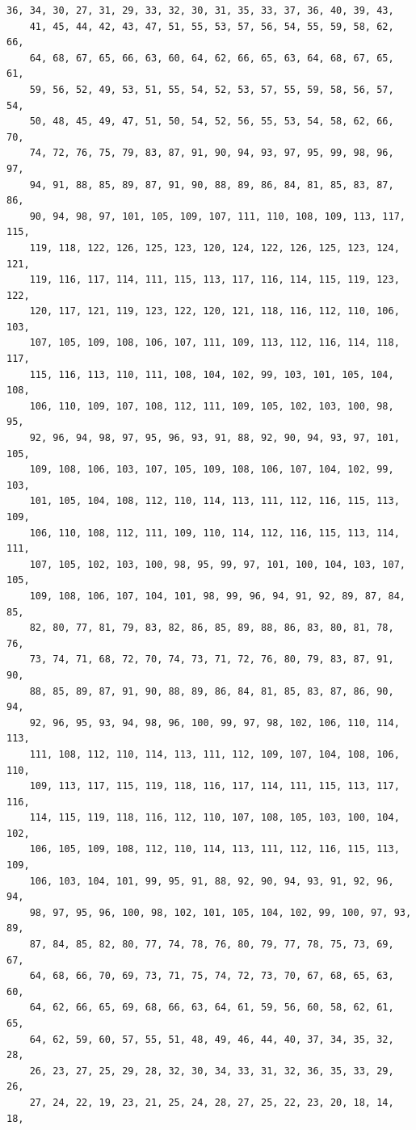 \documentclass[a4paper,11pt]{report}
\begin{document}
{{\begin{Verbatim}[commandchars=!@|,fontsize=\small,frame=single,label=Example]
    36, 34, 30, 27, 31, 29, 33, 32, 30, 31, 35, 33, 37, 36, 40, 39, 43, 
    41, 45, 44, 42, 43, 47, 51, 55, 53, 57, 56, 54, 55, 59, 58, 62, 66, 
    64, 68, 67, 65, 66, 63, 60, 64, 62, 66, 65, 63, 64, 68, 67, 65, 61, 
    59, 56, 52, 49, 53, 51, 55, 54, 52, 53, 57, 55, 59, 58, 56, 57, 54, 
    50, 48, 45, 49, 47, 51, 50, 54, 52, 56, 55, 53, 54, 58, 62, 66, 70, 
    74, 72, 76, 75, 79, 83, 87, 91, 90, 94, 93, 97, 95, 99, 98, 96, 97, 
    94, 91, 88, 85, 89, 87, 91, 90, 88, 89, 86, 84, 81, 85, 83, 87, 86, 
    90, 94, 98, 97, 101, 105, 109, 107, 111, 110, 108, 109, 113, 117, 115, 
    119, 118, 122, 126, 125, 123, 120, 124, 122, 126, 125, 123, 124, 121, 
    119, 116, 117, 114, 111, 115, 113, 117, 116, 114, 115, 119, 123, 122, 
    120, 117, 121, 119, 123, 122, 120, 121, 118, 116, 112, 110, 106, 103, 
    107, 105, 109, 108, 106, 107, 111, 109, 113, 112, 116, 114, 118, 117, 
    115, 116, 113, 110, 111, 108, 104, 102, 99, 103, 101, 105, 104, 108, 
    106, 110, 109, 107, 108, 112, 111, 109, 105, 102, 103, 100, 98, 95, 
    92, 96, 94, 98, 97, 95, 96, 93, 91, 88, 92, 90, 94, 93, 97, 101, 105, 
    109, 108, 106, 103, 107, 105, 109, 108, 106, 107, 104, 102, 99, 103, 
    101, 105, 104, 108, 112, 110, 114, 113, 111, 112, 116, 115, 113, 109, 
    106, 110, 108, 112, 111, 109, 110, 114, 112, 116, 115, 113, 114, 111, 
    107, 105, 102, 103, 100, 98, 95, 99, 97, 101, 100, 104, 103, 107, 105, 
    109, 108, 106, 107, 104, 101, 98, 99, 96, 94, 91, 92, 89, 87, 84, 85, 
    82, 80, 77, 81, 79, 83, 82, 86, 85, 89, 88, 86, 83, 80, 81, 78, 76, 
    73, 74, 71, 68, 72, 70, 74, 73, 71, 72, 76, 80, 79, 83, 87, 91, 90, 
    88, 85, 89, 87, 91, 90, 88, 89, 86, 84, 81, 85, 83, 87, 86, 90, 94, 
    92, 96, 95, 93, 94, 98, 96, 100, 99, 97, 98, 102, 106, 110, 114, 113, 
    111, 108, 112, 110, 114, 113, 111, 112, 109, 107, 104, 108, 106, 110, 
    109, 113, 117, 115, 119, 118, 116, 117, 114, 111, 115, 113, 117, 116, 
    114, 115, 119, 118, 116, 112, 110, 107, 108, 105, 103, 100, 104, 102, 
    106, 105, 109, 108, 112, 110, 114, 113, 111, 112, 116, 115, 113, 109, 
    106, 103, 104, 101, 99, 95, 91, 88, 92, 90, 94, 93, 91, 92, 96, 94, 
    98, 97, 95, 96, 100, 98, 102, 101, 105, 104, 102, 99, 100, 97, 93, 89, 
    87, 84, 85, 82, 80, 77, 74, 78, 76, 80, 79, 77, 78, 75, 73, 69, 67, 
    64, 68, 66, 70, 69, 73, 71, 75, 74, 72, 73, 70, 67, 68, 65, 63, 60, 
    64, 62, 66, 65, 69, 68, 66, 63, 64, 61, 59, 56, 60, 58, 62, 61, 65, 
    64, 62, 59, 60, 57, 55, 51, 48, 49, 46, 44, 40, 37, 34, 35, 32, 28, 
    26, 23, 27, 25, 29, 28, 32, 30, 34, 33, 31, 32, 36, 35, 33, 29, 26, 
    27, 24, 22, 19, 23, 21, 25, 24, 28, 27, 25, 22, 23, 20, 18, 14, 18, 

\end{Verbatim}}}
\end{document}
